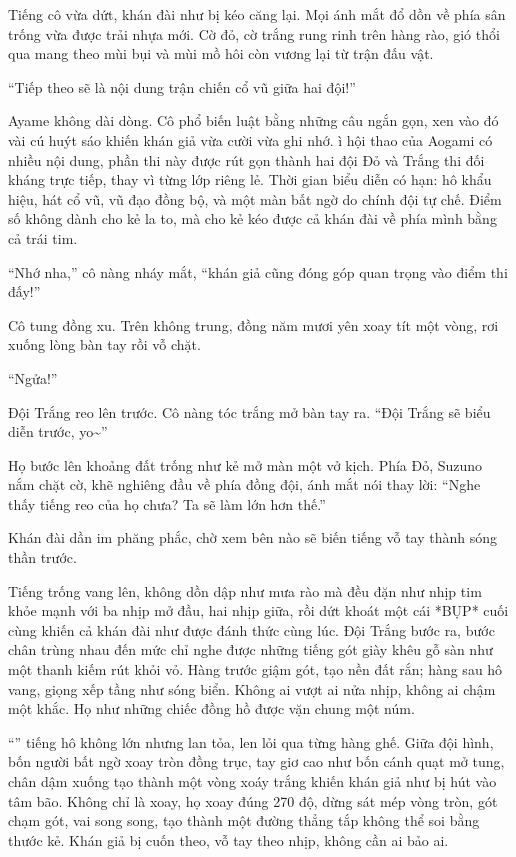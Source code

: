 \documentclass[../main.tex]{subfiles}
\begin{document}
Tiếng cô vừa dứt, khán đài như bị kéo căng lại. Mọi ánh mắt đổ dồn về phía sân trống vừa được trải nhựa mới. Cờ đỏ, cờ trắng rung rinh trên hàng rào, gió thổi qua mang theo mùi bụi và mùi mồ hôi còn vương lại từ trận đấu vật.

``Tiếp theo sẽ là nội dung trận chiến cổ vũ giữa hai đội!''

Ayame không dài dòng. Cô phổ biến luật bằng những câu ngắn gọn, xen vào đó vài cú huýt sáo khiến khán giả vừa cười vừa ghi nhớ. ì hội thao của Aogami có nhiều nội dung, phần thi này được rút gọn thành hai đội Đỏ và Trắng thi đối kháng trực tiếp, thay vì từng lớp riêng lẻ. Thời gian biểu diễn có hạn: hô khẩu hiệu, hát cổ vũ, vũ đạo đồng bộ, và một màn bất ngờ do chính đội tự chế. Điểm số không dành cho kẻ la to, mà cho kẻ kéo được cả khán đài về phía mình bằng cả trái tim.

``Nhớ nha,'' cô nàng nháy mắt, ``khán giả cũng đóng góp quan trọng vào điểm thi đấy!''

Cô tung đồng xu. Trên không trung, đồng năm mươi yên xoay tít một vòng, rơi xuống lòng bàn tay rồi vỗ chặt.

``Ngửa!''

Đội Trắng reo lên trước. Cô nàng tóc trắng mở bàn tay ra. ``Đội Trắng sẽ biểu diễn trước, yo\~{}''

Họ bước lên khoảng đất trống như kẻ mở màn một vở kịch. Phía Đỏ, Suzuno nắm chặt cờ, khẽ nghiêng đầu về phía đồng đội, ánh mắt nói thay lời: ``Nghe thấy tiếng reo của họ chưa? Ta sẽ làm lớn hơn thế.''

Khán đài dần im phăng phắc, chờ xem bên nào sẽ biến tiếng vỗ tay thành sóng thần trước.

\ct

Tiếng trống vang lên, không dồn dập như mưa rào mà đều đặn như nhịp tim khỏe mạnh với ba nhịp mở đầu, hai nhịp giữa, rồi dứt khoát một cái *BỤP* cuối cùng khiến cả khán đài như được đánh thức cùng lúc. Đội Trắng bước ra, bước chân trùng nhau đến mức chỉ nghe được những tiếng gót giày khêu gỗ sàn như một thanh kiếm rút khỏi vỏ. Hàng trước giậm gót, tạo nền đất rắn; hàng sau hô vang, giọng xếp tầng như sóng biển. Không ai vượt ai nửa nhịp, không ai chậm một khắc. Họ như những chiếc đồng hồ được vặn chung một núm.

``'' tiếng hô không lớn nhưng lan tỏa, len lỏi qua từng hàng ghế. Giữa đội hình, bốn người bất ngờ xoay tròn đồng trục, tay giơ cao như bốn cánh quạt mở tung, chân dậm xuống tạo thành một vòng xoáy trắng khiến khán giả như bị hút vào tâm bão. Không chỉ là xoay, họ xoay đúng 270 độ, dừng sát mép vòng tròn, gót chạm gót, vai song song, tạo thành một đường thẳng tắp không thể soi bằng thước kẻ. Khán giả bị cuốn theo, vỗ tay theo nhịp, không cần ai bảo ai.
\end{document}
